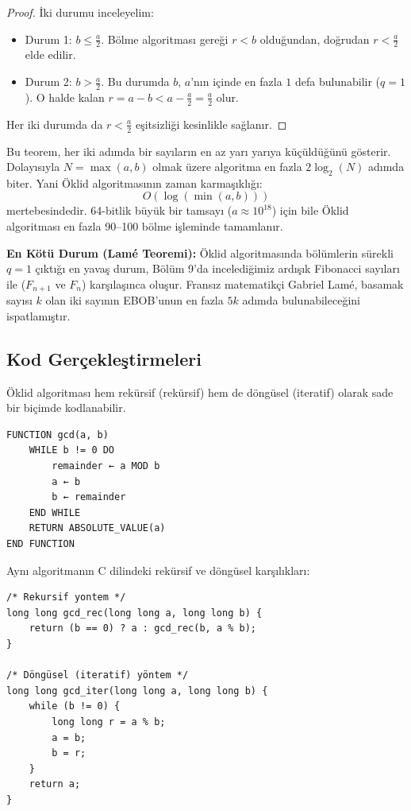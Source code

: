 \begin{proof}
İki durumu inceleyelim:
\begin{itemize}
    \item Durum 1: $b \le \frac{a}{2}$. Bölme algoritması gereği $r < b$ olduğundan, doğrudan $r < \frac{a}{2}$ elde edilir.
    \item Durum 2: $b > \frac{a}{2}$. Bu durumda $b$, $a$'nın içinde en fazla $1$ defa bulunabilir ($q = 1$). O halde kalan $r = a - b < a - \frac{a}{2} = \frac{a}{2}$ olur.
\end{itemize}
Her iki durumda da $r < \frac{a}{2}$ eşitsizliği kesinlikle sağlanır.
\end{proof}

Bu teorem, her iki adımda bir sayıların en az yarı yarıya küçüldüğünü gösterir. Dolayısıyla $N = \max(a, b)$ olmak üzere algoritma en fazla $2 \log_2(N)$ adımda biter. Yani Öklid algoritmasının zaman karmaşıklığı:
\[ O(\log(\min(a, b))) \]
mertebesindedir. 64-bitlik büyük bir tamsayı ($a \approx 10^{18}$) için bile Öklid algoritması en fazla 90--100 bölme işleminde tamamlanır.

\noindent\textbf{En Kötü Durum (Lamé Teoremi):} Öklid algoritmasında bölümlerin sürekli $q = 1$ çıktığı en yavaş durum, Bölüm 9'da incelediğimiz ardışık Fibonacci sayıları ile ($F_{n+1}$ ve $F_n$) karşılaşınca oluşur. Fransız matematikçi Gabriel Lamé, basamak sayısı $k$ olan iki sayının EBOB'unun en fazla $5k$ adımda bulunabileceğini ispatlamıştır.

\subsection*{Kod Gerçekleştirmeleri}

Öklid algoritması hem rekürsif (rekürsif) hem de döngüsel (iteratif) olarak sade bir biçimde kodlanabilir.

\begin{lstlisting}
FUNCTION gcd(a, b)
    WHILE b != 0 DO
        remainder ← a MOD b
        a ← b
        b ← remainder
    END WHILE
    RETURN ABSOLUTE_VALUE(a)
END FUNCTION\end{lstlisting}

Aynı algoritmanın C dilindeki rekürsif ve döngüsel karşılıkları:

\begin{lstlisting}[language=CTemel]
/* Rekursif yontem */
long long gcd_rec(long long a, long long b) {
    return (b == 0) ? a : gcd_rec(b, a % b);
}

/* Döngüsel (iteratif) yöntem */
long long gcd_iter(long long a, long long b) {
    while (b != 0) {
        long long r = a % b;
        a = b;
        b = r;
    }
    return a;
}
\end{lstlisting}

